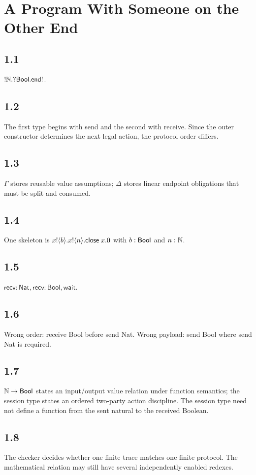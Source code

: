 \chapter{A Program With Someone on the Other End}

\section*{1.1}
$!\mathbb{N}.?\mathsf{Bool}.\mathsf{end!}$.

\section*{1.2}
The first type begins with send and the second with receive. Since the outer constructor determines the next legal action, the protocol order differs.

\section*{1.3}
$\Gamma$ stores reusable value assumptions; $\Delta$ stores linear endpoint obligations that must be split and consumed.

\section*{1.4}
One skeleton is $x!\langle b\rangle.x!\langle n\rangle.\mathsf{close}\;x.0$ with $b:\mathsf{Bool}$ and $n:\mathbb{N}$.

\section*{1.5}
$\mathsf{recv{:}Nat},\mathsf{recv{:}Bool},\mathsf{wait}$.

\section*{1.6}
Wrong order: receive Bool before send Nat. Wrong payload: send Bool where send Nat is required.

\section*{1.7}
$\mathbb{N}\to\mathsf{Bool}$ states an input/output value relation under function semantics; the session type states an ordered two-party action discipline. The session type need not define a function from the sent natural to the received Boolean.

\section*{1.8}
The checker decides whether one finite trace matches one finite protocol. The mathematical relation may still have several independently enabled redexes.

